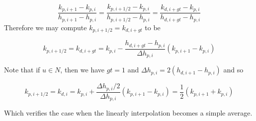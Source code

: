 \documentclass[11pt]{article}
\begin{document}
\begin{equation}
  \frac{k_{p,i+1} - k_{p,i}}{h_{p,i+1} - h_{p,i}}
   = 
  \frac{k_{p,i+1/2} - k_{p,i}}{h_{p,i+1/2} - h_{p,i}}
   = 
  \frac{k_{d,i+gt} - k_{p,i}}{h_{d,i+gt} - h_{p,i}}
\end{equation}
Therefore we may compute $k_{p,i+1/2} = k_{d,i+gt}$ to be

\begin{equation}
  k_{p,i+1/2} = k_{d,i+gt} = k_{p,i} - \frac{h_{d,i+gt} - h_{p,i}}{\Delta h_{p,i}} (k_{p,i+1} - k_{p,i})
\end{equation}

Note that if $u \in N$, then we have $gt=1$ and $\Delta h_{p,i}= 2(h_{d,i+1} - h_{p,i})$ and so

\begin{equation}
  k_{p,i+1/2} = k_{d,i} = k_{p,i} + \frac{\Delta h_{p,i} / 2}{\Delta h_{p,i}} (k_{p,i+1} - k_{p,i}) = \frac{1}{2} (k_{p,i+1} + k_{p,i})
\end{equation}

Which verifies the case when the linearly interpolation becomes a simple average.
\end{document}
